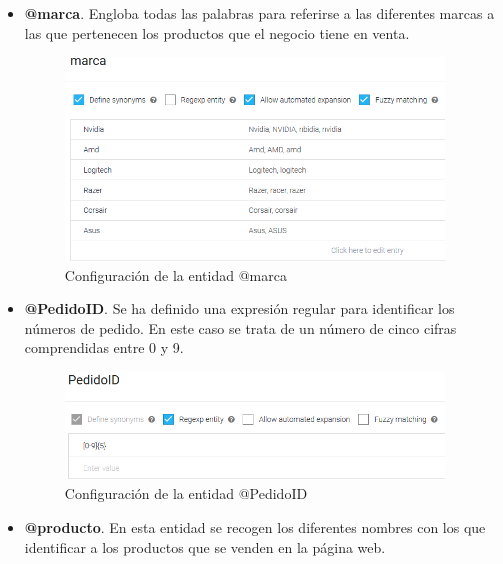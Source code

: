 \begin{itemize}
    \item \textbf{@marca}. Engloba todas las palabras para referirse a las diferentes marcas a las que pertenecen los productos que el negocio tiene en venta.
    
     \begin{figure}[ht]
    	\begin{center}
    		\includegraphics[width = 0.95\textwidth]{Figuras/entityMarca.PNG}
    	\end{center}
    	\caption{\label{fig:entidadMarca} Configuración de la entidad @marca}
    \end{figure}
    
    \item \textbf{@PedidoID}. Se ha definido una expresión regular para identificar los números de pedido. En este caso se trata de un número de cinco cifras comprendidas entre 0 y 9.
    
     \begin{figure}[ht]
    	\begin{center}
    		\includegraphics[width = 0.95\textwidth]{Figuras/entityPedidoID.PNG}
    	\end{center}
    	\caption{\label{fig:entidadPedido} Configuración de la entidad @PedidoID}
    \end{figure}
    
    \newpage
    
    \item \textbf{@producto}. En esta entidad se recogen los diferentes nombres con los que identificar a los productos que se venden en la página web.
    

\end{itemize}
